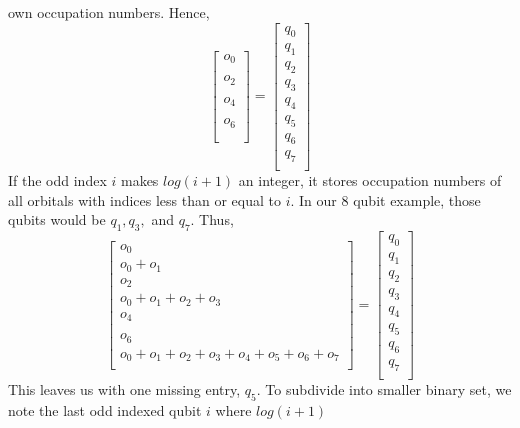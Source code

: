 \documentclass{article}
\begin{document}
    own occupation numbers. Hence,
    \[
    \begin{bmatrix}
     o_0\\
     \\
     o_2  \\
     \\
     o_4 \\
     \\
     o_6  \\
     \\
    \end{bmatrix}
    =
    \begin{bmatrix}
    q_0 \\
    q_1 \\
    q_2 \\
    q_3 \\
    q_4 \\
    q_5 \\
    q_6 \\
    q_7 \\
    \end{bmatrix}
    \]
    If the odd index \(i\) makes \(log(i+1)\) an integer, it stores occupation
    numbers of all orbitals with indices less than or equal to \(i\). In our 8 qubit
    example, those qubits would be \(q_1, q_3,\) and \( q_7\). Thus,
    \[
    \begin{bmatrix}
     o_0\\
     o_0 + o_1\\
     o_2  \\
     o_0 + o_1 + o_2 +o_3\\
     o_4 \\
     \\
     o_6  \\
     o_0 + o_1 + o_2 +o_3 + o_4 + o_5 + o_6 +o_7\\
    \end{bmatrix}
    =
    \begin{bmatrix}
    q_0 \\
    q_1 \\
    q_2 \\
    q_3 \\
    q_4 \\
    q_5 \\
    q_6 \\
    q_7 \\
    \end{bmatrix}
    \]
    This leaves us with one missing entry, \(q_5\). To subdivide into smaller
    binary set, we note the last odd indexed qubit \(i\) where \(log(i+1)\)
\end{document}
